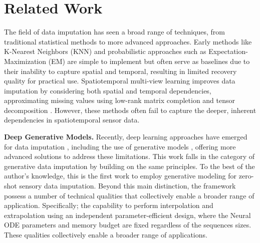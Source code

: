 \section{Related Work}
\label{sec:related_work}

 The field of data imputation has seen a broad range of techniques, from traditional statistical methods to more advanced approaches. Early methods like K-Nearest Neighbors (KNN) \cite{knn} and probabilistic approaches such as Expectation-Maximization (EM) \cite{EM} are simple to implement but often serve as baselines due to their inability to capture spatial and temporal, resulting in limited recovery quality for practical use. Spatiotemporal multi-view learning \cite{ST-MVL} improves data imputation by considering both spatial and temporal dependencies, approximating missing values using low-rank matrix completion \cite{LRMC,ensemble} and tensor decomposition \cite{tensor,tensor2}. However, these methods often fail to capture the deeper, inherent dependencies in spatiotemporal sensor data.

\textbf{Deep Generative Models.} %
Recently, deep learning approaches have emerged for data imputation \cite{wang2024deep, sun2023deep}, including the use of generative models \cite{adhikari2022comprehensive, shahbazian2023generative}, offering more advanced solutions to address these limitations.
This work falls in the category of generative data imputation by building on the same principles. To the best of the author's knowledge, this is the first work to employ generative modeling for zero-shot sensory data imputation. Beyond this main distinction, the framework possess a number of technical qualities that collectively enable a broader range of application. Specifically; the capability to perform interpolation and extrapolation using an independent parameter-efficient design, where the Neural ODE parameters and memory budget are fixed regardless of the sequences sizes. These qualities collectively enable a broader range of applications. 

